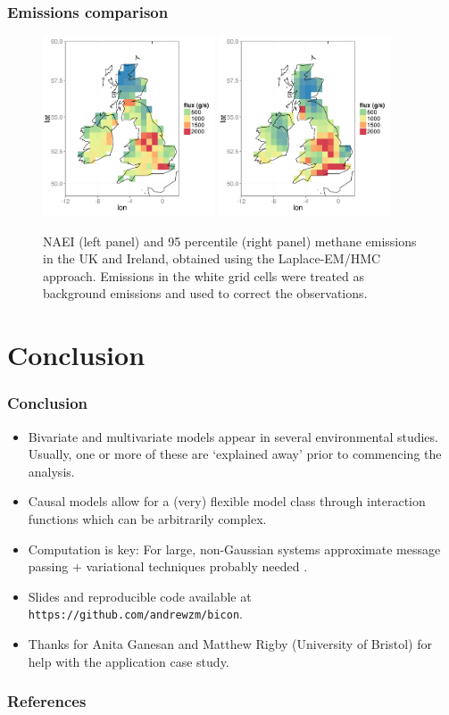 \documentclass{beamer}
\begin{document}
\begin{frame}
\frametitle{Emissions comparison}

\begin{figure}
\includegraphics[width=2.0in]{NAEI_land_only.png}  
\includegraphics[width=2.0in]{Em95.png}  
	\caption{NAEI (left panel) and 95 percentile (right panel) methane emissions in the UK and Ireland, obtained using the Laplace-EM/HMC approach. Emissions in the white grid cells were treated as background emissions and used to correct the observations.}
\end{figure}
\end{frame}



\section{Conclusion}

\begin{frame}
\sectionpage
\end{frame}


\begin{frame}
\frametitle{Conclusion}

\begin{itemize}
\item Bivariate and multivariate models appear in several environmental studies. Usually, one or more of these are `explained away' prior to commencing the analysis.
\item Causal models allow for a (very) flexible model class through interaction functions which can be arbitrarily complex.
\item Computation is key: For large, non-Gaussian systems approximate message passing + variational techniques probably needed \citep{Cseke_2014}.
\item Slides and reproducible code available at \texttt{https://github.com/andrewzm/bicon}.
\item Thanks for Anita Ganesan and Matthew Rigby (University of Bristol) for help with the application case study.
\end{itemize}
\end{frame}

\small

\begin{frame}[allowframebreaks]
\frametitle{References}




\end{frame}
\end{document}
